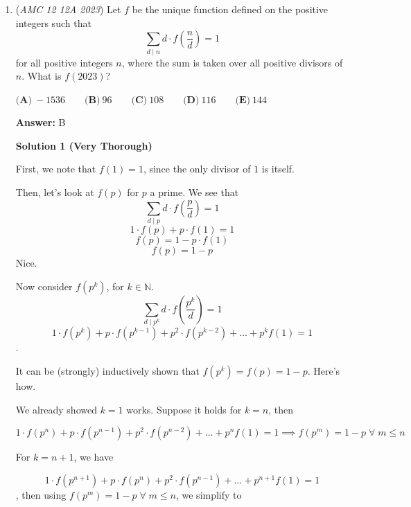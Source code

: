 \begin{enumerate}
 For the two distances to be equal, $Q$ and $S$ must both be at distance $1$ or both be at distance $2$ from $R$. The distance-$3$ case is impossible because only one vertex is at that distance.

 Thus,
 \[P(d(Q,R)=d(R,S)) =\frac{5\cdot4+5\cdot4}{11\cdot10} =\frac4{11}.\]

 Therefore,
 \[P(d(Q,R)>d(R,S)) =\frac12\left(1-\frac4{11}\right) =\boxed{\textbf{(A)}\ \frac7{22}}.\]

 


 \textbf{Vide Solution by SpreadTheMathLove(Casework and Complementary)} 


	\item (\textit{AMC 12 12A 2023}) Let $f$ be the unique function defined on the positive integers such that
 \[\sum_{d\mid n}d\cdot f\left(\frac{n}{d}\right)=1\]for all positive integers $n$, where the sum is taken over all positive divisors of $n$. What is $f(2023)$?


 $\textbf{(A)}~-1536\qquad\textbf{(B)}~96\qquad\textbf{(C)}~108\qquad\textbf{(D)}~116\qquad\textbf{(E)}~144$

 \textbf{Answer: }B



\textbf{Solution 1 (Very Thorough)}

First, we note that $f(1) = 1$, since the only divisor of $1$ is itself.   

 
Then, let's look at $f(p)$ for $p$ a prime. We see that
 \[\sum_{d \mid p} d \cdot f\left(\frac{p}{d}\right) = 1\]
 \[1 \cdot f(p) + p \cdot f(1) = 1\]
 \[f(p) = 1 - p \cdot f(1)\]
 \[f(p) = 1-p\]Nice.   

 Now consider $f(p^k)$, for $k \in \mathbb{N}$. 
 \[\sum_{d \mid p^k} d \cdot f\left(\frac{p^k}{d}\right) = 1\]
 \[1 \cdot f(p^k) + p \cdot f(p^{k-1}) + p^2 \cdot f(p^{k-2}) + \dotsc + p^k f(1) = 1\].  

 
It can be (strongly) inductively shown that $f(p^k) = f(p) = 1-p$. Here's how.    

 We already showed $k=1$ works. Suppose it holds for $k = n$, then

 
 \[1 \cdot f(p^n) + p \cdot f(p^{n-1}) + p^2 \cdot f(p^{n-2}) + \dotsc + p^n f(1) = 1 \implies f(p^m) = 1-p \; \forall \; m \leqslant n\]

 For $k = n+1$, we have

 
 \[1 \cdot f(p^{n+1}) + p \cdot f(p^{n}) + p^2 \cdot f(p^{n-1}) + \dotsc + p^{n+1} f(1) = 1\], then using $f(p^m) = 1-p \; \forall \; m \leqslant n$, we simplify to


\end{enumerate}
